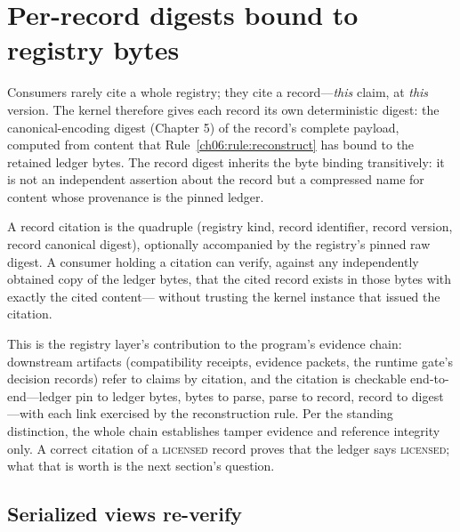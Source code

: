\section{Per-record digests bound to registry bytes}\label{ch06:digests}

Consumers rarely cite a whole registry; they cite a record---\emph{this}
claim, at \emph{this} version. The kernel therefore gives each record its
own deterministic digest: the canonical-encoding digest (Chapter 5) of
the record's complete payload, computed from content that
Rule~\ref{ch06:rule:reconstruct} has bound to the retained ledger bytes.
The record digest inherits the byte binding transitively: it is not an
independent assertion about the record but a compressed name for content
whose provenance is the pinned ledger.

\begin{definition}\label{ch06:def:citation}
A record citation is the quadruple (registry kind, record identifier,
record version, record canonical digest), optionally accompanied by the
registry's pinned raw digest. A consumer holding a citation can verify,
against any independently obtained copy of the ledger bytes, that the
cited record exists in those bytes with exactly the cited content---
without trusting the kernel instance that issued the citation.
\end{definition}

This is the registry layer's contribution to the program's evidence
chain: downstream artifacts (compatibility receipts, evidence packets,
the runtime gate's decision records) refer to claims by citation, and
the citation is checkable end-to-end---ledger pin to ledger bytes, bytes
to parse, parse to record, record to digest---with each link exercised
by the reconstruction rule. Per the standing distinction, the whole
chain establishes tamper evidence and reference integrity only. A
correct citation of a \textsc{licensed} record proves that the ledger
says \textsc{licensed}; what that is worth is the next section's
question.

\subsection{Serialized views re-verify}

